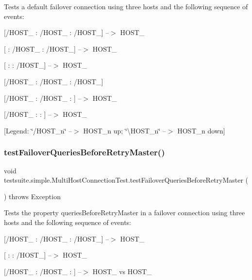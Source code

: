 Tests a default failover connection using three hosts and the following sequence of events\+:
\begin{DoxyItemize}
\item \mbox{[}/\+H\+O\+S\+T\+\_ \+: /\+H\+O\+S\+T\+\_ \+: /\+H\+O\+S\+T\+\_\mbox{]} --$>$ H\+O\+S\+T\+\_
\item \mbox{[} \+: /\+H\+O\+S\+T\+\_ \+: /\+H\+O\+S\+T\+\_\mbox{]} --$>$ H\+O\+S\+T\+\_
\item \mbox{[} \+:  \+: /\+H\+O\+S\+T\+\_\mbox{]} --$>$ H\+O\+S\+T\+\_
\item \mbox{[}/\+H\+O\+S\+T\+\_ \+: /\+H\+O\+S\+T\+\_ \+: /\+H\+O\+S\+T\+\_\mbox{]}
\item \mbox{[}/\+H\+O\+S\+T\+\_ \+: /\+H\+O\+S\+T\+\_ \+: \mbox{]} --$>$ H\+O\+S\+T\+\_
\item \mbox{[}/\+H\+O\+S\+T\+\_ \+:  \+: \mbox{]} --$>$ H\+O\+S\+T\+\_
\end{DoxyItemize}

\mbox{[}Legend\+: \char`\"{}/\+H\+O\+S\+T\+\_\+n\char`\"{} --$>$ H\+O\+S\+T\+\_\+n up; \char`\"{}\textbackslash{}\+H\+O\+S\+T\+\_\+n\char`\"{} --$>$ H\+O\+S\+T\+\_\+n down\mbox{]} \mbox{\label{classtestsuite_1_1simple_1_1_multi_host_connection_test_a4497dff5cf4989cdacb5d7a771f8469a}} 
\subsubsection{\texorpdfstring{test\+Failover\+Queries\+Before\+Retry\+Master()}{testFailoverQueriesBeforeRetryMaster()}}
{\footnotesize\ttfamily void testsuite.\+simple.\+Multi\+Host\+Connection\+Test.\+test\+Failover\+Queries\+Before\+Retry\+Master (\begin{DoxyParamCaption}{ }\end{DoxyParamCaption}) throws Exception}

Tests the property \textquotesingle{}queries\+Before\+Retry\+Master\textquotesingle{} in a failover connection using three hosts and the following sequence of events\+:
\begin{DoxyItemize}
\item \mbox{[}/\+H\+O\+S\+T\+\_ \+: /\+H\+O\+S\+T\+\_ \+: /\+H\+O\+S\+T\+\_\mbox{]} --$>$ H\+O\+S\+T\+\_
\item \mbox{[} \+:  \+: /\+H\+O\+S\+T\+\_\mbox{]} --$>$ H\+O\+S\+T\+\_
\item \mbox{[}/\+H\+O\+S\+T\+\_ \+: /\+H\+O\+S\+T\+\_ \+: \mbox{]} --$>$ H\+O\+S\+T\+\_ vs H\+O\+S\+T\+\_
\end{DoxyItemize}

